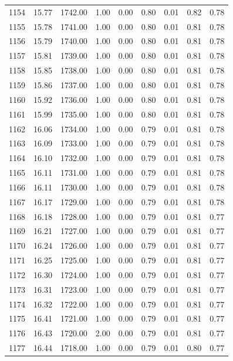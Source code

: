 \documentclass{article}\usepackage[]{graphicx}\usepackage[]{color}
\begin{document}
\begin{longtable}{rrrrrrrrr}
  1154 & 15.77 & 1742.00 & 1.00 & 0.00 & 0.80 & 0.01 & 0.82 & 0.78 \\ 
  1155 & 15.78 & 1741.00 & 1.00 & 0.00 & 0.80 & 0.01 & 0.81 & 0.78 \\ 
  1156 & 15.79 & 1740.00 & 1.00 & 0.00 & 0.80 & 0.01 & 0.81 & 0.78 \\ 
  1157 & 15.81 & 1739.00 & 1.00 & 0.00 & 0.80 & 0.01 & 0.81 & 0.78 \\ 
  1158 & 15.85 & 1738.00 & 1.00 & 0.00 & 0.80 & 0.01 & 0.81 & 0.78 \\ 
  1159 & 15.86 & 1737.00 & 1.00 & 0.00 & 0.80 & 0.01 & 0.81 & 0.78 \\ 
  1160 & 15.92 & 1736.00 & 1.00 & 0.00 & 0.80 & 0.01 & 0.81 & 0.78 \\ 
  1161 & 15.99 & 1735.00 & 1.00 & 0.00 & 0.80 & 0.01 & 0.81 & 0.78 \\ 
  1162 & 16.06 & 1734.00 & 1.00 & 0.00 & 0.79 & 0.01 & 0.81 & 0.78 \\ 
  1163 & 16.09 & 1733.00 & 1.00 & 0.00 & 0.79 & 0.01 & 0.81 & 0.78 \\ 
  1164 & 16.10 & 1732.00 & 1.00 & 0.00 & 0.79 & 0.01 & 0.81 & 0.78 \\ 
  1165 & 16.11 & 1731.00 & 1.00 & 0.00 & 0.79 & 0.01 & 0.81 & 0.78 \\ 
  1166 & 16.11 & 1730.00 & 1.00 & 0.00 & 0.79 & 0.01 & 0.81 & 0.78 \\ 
  1167 & 16.17 & 1729.00 & 1.00 & 0.00 & 0.79 & 0.01 & 0.81 & 0.78 \\ 
  1168 & 16.18 & 1728.00 & 1.00 & 0.00 & 0.79 & 0.01 & 0.81 & 0.77 \\ 
  1169 & 16.21 & 1727.00 & 1.00 & 0.00 & 0.79 & 0.01 & 0.81 & 0.77 \\ 
  1170 & 16.24 & 1726.00 & 1.00 & 0.00 & 0.79 & 0.01 & 0.81 & 0.77 \\ 
  1171 & 16.25 & 1725.00 & 1.00 & 0.00 & 0.79 & 0.01 & 0.81 & 0.77 \\ 
  1172 & 16.30 & 1724.00 & 1.00 & 0.00 & 0.79 & 0.01 & 0.81 & 0.77 \\ 
  1173 & 16.31 & 1723.00 & 1.00 & 0.00 & 0.79 & 0.01 & 0.81 & 0.77 \\ 
  1174 & 16.32 & 1722.00 & 1.00 & 0.00 & 0.79 & 0.01 & 0.81 & 0.77 \\ 
  1175 & 16.41 & 1721.00 & 1.00 & 0.00 & 0.79 & 0.01 & 0.81 & 0.77 \\ 
  1176 & 16.43 & 1720.00 & 2.00 & 0.00 & 0.79 & 0.01 & 0.81 & 0.77 \\ 
  1177 & 16.44 & 1718.00 & 1.00 & 0.00 & 0.79 & 0.01 & 0.80 & 0.77 \\ 

\end{longtable}
\end{document}
